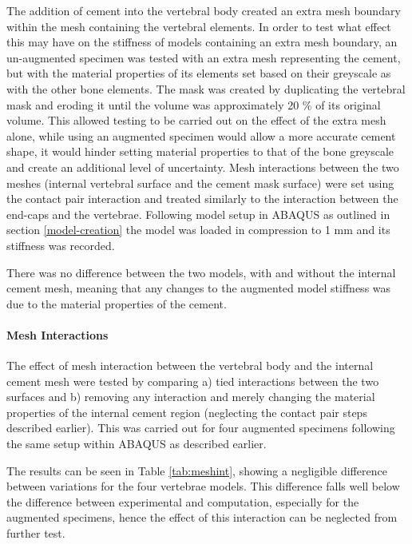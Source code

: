 The addition of cement into the vertebral body created an extra mesh boundary
within the mesh containing the vertebral elements. In order to test what
effect this may have on the stiffness of models containing an extra
mesh boundary, an un-augmented specimen was tested with an extra mesh
representing the cement, but with the material properties of its
elements set based on their greyscale as with the other bone elements.
The mask was created by duplicating the vertebral mask and eroding it
until the volume was approximately 20 \% of its original volume. This
allowed testing to be carried out on the effect of the extra mesh alone,
while using an augmented specimen would allow a more accurate cement
shape, it would hinder setting material properties to that of the bone
greyscale and create an additional level of uncertainty. Mesh
interactions between the two meshes (internal vertebral surface and the
cement mask surface) were set using the contact pair interaction and
treated similarly to the interaction between the end-caps and the
vertebrae. Following model setup in ABAQUS as outlined in section \ref{model-creation} the model
was loaded in compression to 1 mm and its stiffness was recorded.

There was no difference between the two models, with and without the
internal cement mesh, meaning that any changes to the augmented model
stiffness was due to the material properties of the cement.

\paragraph{Mesh Interactions}\label{mesh-interactions}

The effect of mesh interaction between the vertebral body and the
internal cement mesh were tested by comparing a) tied interactions
between the two surfaces and b) removing any interaction and merely
changing the material properties of the internal cement region
(neglecting the contact pair steps described earlier). This was carried
out for four augmented specimens following the same setup within ABAQUS
as described earlier.

The results can be seen in Table \ref{tab:meshint}, showing a negligible
difference
between variations for the four vertebrae models. This difference falls
well below the difference between experimental and computation,
especially for the augmented specimens, hence the effect of this
interaction can be neglected from further test.

